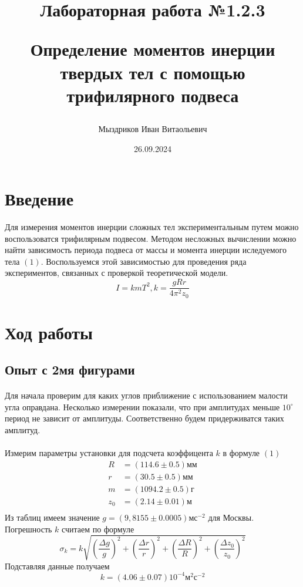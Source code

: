\documentclass[a4paper, 12pt]{article}
\title{\begin{center}Лабораторная работа №1.2.3\end{center}
Определение моментов инерции твердых тел с помощью трифилярного подвеса}
\author{Мыздриков Иван Витаольевич}
\date{26.09.2024}
\begin{document}
    \maketitle
    \newpage

    \section{Введение}
    Для измерения моментов инерции сложных тел экспериментальным путем можно воспользоватся
    трифилярным подвесом. Методом несложных вычислении можно найти зависимость периода подвеса от массы и момента инерции иследуемого тела $(1)$. Воспользуемся этой зависимостью для проведения ряда экспериментов, связанных с проверкой теоретической модели.
    \begin{equation}
    I=kmT^2,k=\frac{gRr}{4\pi^2z_0}
    \end{equation}

    \section{Ход работы}
    \subsection{Опыт с 2мя фигурами}

    \paragraph{}
    Для начала проверим для каких углов приближение с использованием малости угла оправдана.
    Несколько измерении показали, что при амплитудах меньше $10^\circ$ период не зависит от
    амплитуды. Соответственно будем придерживатся таких амплитуд.
    \paragraph{}
    Измерим параметры установки для подсчета коэффицента $k$ в формуле $(1)$
    \begin{align*}
        R &= (114.6 \pm 0.5) мм\\
        r &= (30.5 \pm 0.5) мм\\
        m &= (1094.2 \pm 0.5) г\\
        z_0 &= (2.14 \pm 0.01) м\\
    \end{align*}
    Из таблиц имеем значение $g=(9,8155 \pm 0.0005)мс^{-2}$ для Москвы. Погрешность $k$ считаем по формуле
    \[\sigma_k=k\sqrt{\left(\frac{\Delta g}{g}\right)^2 +
                     \left(\frac{\Delta r}{r}\right)^2 +
                     \left(\frac{\Delta R}{R}\right)^2 +
                     \left(\frac{\Delta z_0}{z_0}\right)^2}\]
    Подставляя данные получаем
    \[k=(4.06\pm0.07) 10^{-4} м^2с^{-2}\]
\end{document}
